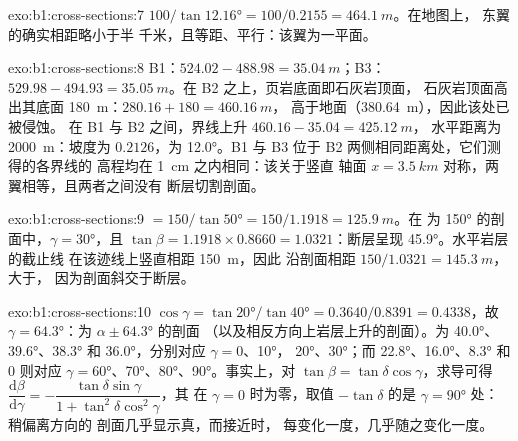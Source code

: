 \begin{solution}{exo:b1:cross-sections:7}
$100/\tan\ang{12.16} = 100/0.2155 = \qty{464.1}{m}$。在地图上，
东翼的确实相距略小于半
千米，且等距、平行：该翼为一平面。
\end{solution}

\begin{solution}{exo:b1:cross-sections:8}
B1：$524.02 - 488.98 = \qty{35.04}{m}$；B3：$529.98 - 494.93 =
\qty{35.05}{m}$。在 B2 之上，页岩底面即石灰岩顶面，
石灰岩顶面高出其底面 \qty{180}{m}：$280.16 + 180 = \qty{460.16}{m}$，
高于地面（\qty{380.64}{m}），因此该处已被侵蚀。
在 B1 与 B2 之间，界线上升 $460.16 - 35.04 = \qty{425.12}{m}$，
水平距离为 \qty{2000}{m}：坡度为 $0.2126$，为 \ang{12.0}。B1
与 B3 位于 B2 两侧相同距离处，它们测得的各界线的
高程均在 \qty{1}{cm} 之内相同：该关于竖直
轴面 $x = \qty{3.5}{km}$ 对称，两翼相等，且两者之间没有
断层切割剖面。
\end{solution}

\begin{solution}{exo:b1:cross-sections:9}
 $= 150/\tan\ang{50} = 150/1.1918 = \qty{125.9}{m}$。在
为 \ang{150} 的剖面中，$\gamma = \ang{30}$，且 $\tan\beta = 1.1918\times0.8660 =
1.0321$：断层呈现 \ang{45.9}。水平岩层的截止线
在该迹线上竖直相距 \qty{150}{m}，因此
沿剖面相距 $150/1.0321 = \qty{145.3}{m}$，大于，
因为剖面斜交于断层。
\end{solution}

\begin{solution}{exo:b1:cross-sections:10}
$\cos\gamma = \tan\ang{20}/\tan\ang{40} = 0.3640/0.8391 = 0.4338$，故
$\gamma = \ang{64.3}$：为 $\alpha \pm \ang{64.3}$ 的剖面
（以及相反方向上岩层上升的剖面）。为
\ang{40.0}、\ang{39.6}、\ang{38.3} 和 \ang{36.0}，分别对应 $\gamma = 0$、\ang{10}，
\ang{20}、\ang{30}；而 \ang{22.8}、\ang{16.0}、\ang{8.3} 和 $0$ 则对应
$\gamma = \ang{60}$、\ang{70}、\ang{80}、\ang{90}。事实上，对
$\tan\beta = \tan\delta\cos\gamma$，求导可得
$\dfrac{\mathrm d\beta}{\mathrm d\gamma} =
-\dfrac{\tan\delta\sin\gamma}{1 + \tan^2\delta\cos^2\gamma}$，其
在 $\gamma = 0$ 时为零，取值 $-\tan\delta$ 的是 $\gamma = \ang{90}$ 处：稍偏离方向的
剖面几乎显示真，而接近时，
每变化一度，几乎随之变化一度。
\end{solution}

